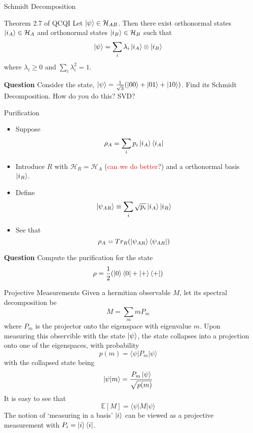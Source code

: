\documentclass[handout]{beamer}
\newcommand{\Hilb}{\mathcal{H}}
\newcommand{\Exp}{\mathbb{E}}
\begin{document}
\begin{frame}{Schmidt Decomposition}
\begin{block}{Theorem 2.7 of QCQI}
Let $\ket{\psi}\in\Hilb_{AB}$. \pause Then there exist orthonormal states $\ket{i_A} \in \Hilb_A$ and orthonormal states $\ket{i_B}\in\Hilb_B$ such that \pause
\[\ket{\psi} = \sum_i\lambda_i\ket{i_A}\otimes\ket{i_B}\] \pause
where $\lambda_i \geq 0$ and $\sum_i\lambda_i^2 = 1$.
\end{block}
\textbf{Question} Consider the state, $\ket{\psi} = \frac{1}{\sqrt{3}}(\ket{00} + \ket{01} + \ket{10})$. Find its Schmidt Decomposition. How do you do this? SVD?
\end{frame}

\begin{frame}{Purification}
\begin{itemize}
\item Suppose
\[\rho_A = \sum_ip_i\ket{i_A}\bra{i_A}\]
\item Introduce $R$ with $\Hilb_R = \Hilb_A$ (\textcolor{red}{can we do better}?) and a orthonormal basis $\ket{i_R}$. \pause
\item Define
\[\ket{\psi_{AR}} \equiv \sum_i\sqrt{p_i}\ket{i_A}\ket{i_R}\]\pause
\item See that 
\[\rho_A = Tr_R(\ket{\psi_{AR}}\bra{\psi_{AR}})\]\pause
\end{itemize}\vspace{-6mm}
\textbf{Question}     Compute the purification for the state 
\[\rho = \frac{1}{2}(\ket{0}\bra{0} + \ket{+}\bra{+})\]
\end{frame}

\begin{frame}{Projective Measurements}
Given a hermitian observable $M$, let its spectral decomposition be\pause
\[M = \sum_mmP_m\]\pause
where $P_m$ is the projector onto the eigenspace with eigenvalue $m$. \pause Upon measuring this observible with the state $\ket{\psi}$, the state collapses into a projection onto one of the eigenspaces, with probability \pause
\[p(m) = \langle\psi|P_m|\psi\rangle\]\pause
with the collapsed state being\pause
\[\ket{\psi|m} = \frac{P_m\ket{\psi}}{\sqrt{p(m)}}\]\pause
It is easy to see that\pause
\[\Exp[M] = \langle\psi|M|\psi\rangle\]\pause
The notion of `measuring in a basis' $\ket{i}$ can be viewed as a projective measurement with $P_i = \ket{i}\bra{i}$.
\end{frame}
\end{document}
